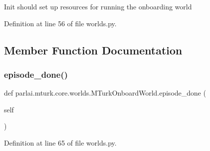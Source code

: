 \begin{DoxyVerb}Init should set up resources for running the onboarding world\end{DoxyVerb}
 

Definition at line 56 of file worlds.\+py.



\subsection{Member Function Documentation}
\mbox{\label{classparlai_1_1mturk_1_1core_1_1worlds_1_1MTurkOnboardWorld_aa75a4f3dd42ae431f6cf0e65d3c0eeb7}} 
\subsubsection{\texorpdfstring{episode\+\_\+done()}{episode\_done()}}
{\footnotesize\ttfamily def parlai.\+mturk.\+core.\+worlds.\+M\+Turk\+Onboard\+World.\+episode\+\_\+done (\begin{DoxyParamCaption}\item[{}]{self }\end{DoxyParamCaption})}



Definition at line 65 of file worlds.\+py.



